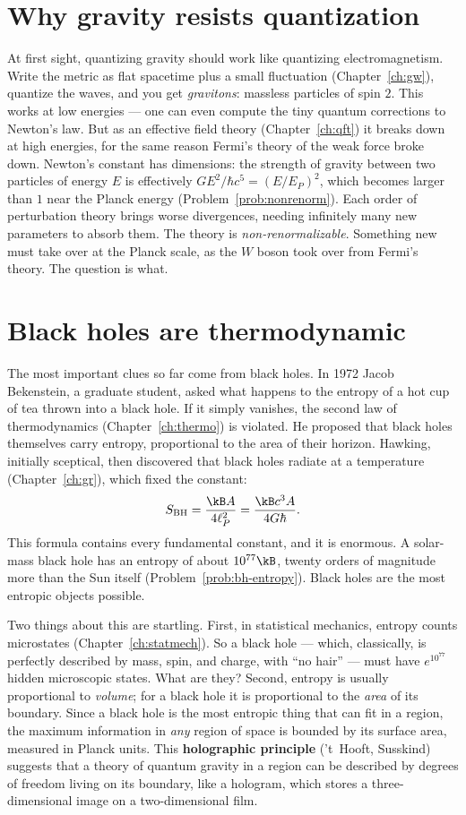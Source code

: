 \section{Why gravity resists quantization}

At first sight, quantizing gravity should work like quantizing electromagnetism. Write the metric as flat spacetime plus a small fluctuation (Chapter~\ref{ch:gw}), quantize the waves, and you get \emph{gravitons}: massless particles of spin $2$. This works at low energies --- one can even compute the tiny quantum corrections to Newton's law. But as an effective field theory (Chapter~\ref{ch:qft}) it breaks down at high energies, for the same reason Fermi's theory of the weak force broke down. Newton's constant has dimensions: the strength of gravity between two particles of energy $E$ is effectively $GE^2/\hbar c^5 = (E/E_P)^2$, which becomes larger than $1$ near the Planck energy (Problem~\ref{prob:nonrenorm}). Each order of perturbation theory brings worse divergences, needing infinitely many new parameters to absorb them. The theory is \emph{non-renormalizable}. Something new must take over at the Planck scale, as the $W$ boson took over from Fermi's theory. The question is what.

\section{Black holes are thermodynamic}

The most important clues so far come from black holes. In 1972 Jacob Bekenstein, a graduate student, asked what happens to the entropy of a hot cup of tea thrown into a black hole. If it simply vanishes, the second law of thermodynamics (Chapter~\ref{ch:thermo}) is violated. He proposed that black holes themselves carry entropy, proportional to the area of their horizon. Hawking, initially sceptical, then discovered that black holes radiate at a temperature (Chapter~\ref{ch:gr}), which fixed the constant:
\[
  S_{\text{BH}} = \frac{\kB A}{4\ell_P^2} = \frac{\kB c^3A}{4G\hbar}.
\]
This formula contains every fundamental constant, and it is enormous. A solar-mass black hole has an entropy of about $10^{77}\kB$, twenty orders of magnitude more than the Sun itself (Problem~\ref{prob:bh-entropy}). Black holes are the most entropic objects possible.

Two things about this are startling. First, in statistical mechanics, entropy counts microstates (Chapter~\ref{ch:statmech}). So a black hole --- which, classically, is perfectly described by mass, spin, and charge, with ``no hair'' --- must have $e^{10^{77}}$ hidden microscopic states. What are they? Second, entropy is usually proportional to \emph{volume}; for a black hole it is proportional to the \emph{area} of its boundary. Since a black hole is the most entropic thing that can fit in a region, the maximum information in \emph{any} region of space is bounded by its surface area, measured in Planck units. This \textbf{holographic principle} ('t~Hooft, Susskind) suggests that a theory of quantum gravity in a region can be described by degrees of freedom living on its boundary, like a hologram, which stores a three-dimensional image on a two-dimensional film.

